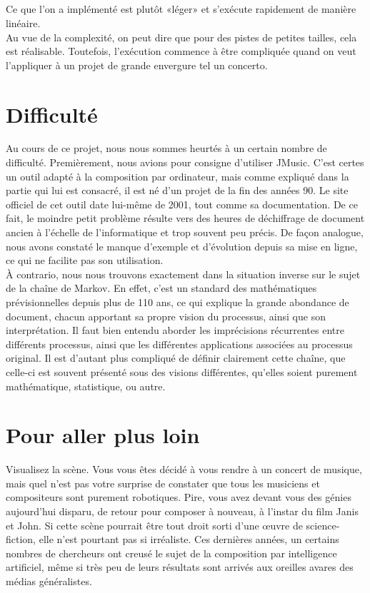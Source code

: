 \documentclass[12pt, a4paper]{article}
\begin{document}
        \subsection*{}
            Ce que l'on a implémenté est plutôt «léger» et s’exécute rapidement de manière linéaire.\\
Au vue de la complexité, on peut dire que pour des pistes de petites tailles, cela est réalisable. Toutefois, l’exécution commence à être compliquée quand on veut l'appliquer à un projet de grande envergure tel un concerto.
                
            
    
    
    \section{Difficulté}
        Au cours de ce projet, nous nous sommes heurtés à un certain nombre de difficulté. Premièrement, nous avions pour consigne d’utiliser JMusic. C’est certes un outil adapté à la composition par ordinateur, mais comme expliqué dans la partie qui lui est consacré, il est né d’un projet de la fin des années 90. Le site officiel de cet outil date lui-même de 2001, tout comme sa documentation. De ce fait, le moindre petit problème résulte vers des heures de déchiffrage de document ancien à l’échelle de l’informatique et trop souvent peu précis. De façon analogue, nous avons constaté le manque d’exemple et d’évolution depuis sa mise en ligne, ce qui ne facilite pas son utilisation.\\
À contrario, nous nous trouvons exactement dans la situation inverse sur le sujet de la chaîne de Markov. En effet, c’est un standard des mathématiques prévisionnelles depuis plus de 110 ans, ce qui explique la grande abondance de document, chacun apportant sa propre vision du processus, ainsi que son interprétation. Il faut bien entendu aborder les imprécisions récurrentes entre différents processus, ainsi que les différentes applications associées au processus original. Il est d’autant plus compliqué de définir clairement cette chaîne, que celle-ci est souvent présenté sous des visions différentes, qu’elles soient purement mathématique, statistique, ou autre.
    
    
    \section{Pour aller plus loin}
        Visualisez la scène. Vous vous êtes décidé à vous rendre à un concert de musique, mais quel n’est pas votre surprise de constater que tous les musiciens et compositeurs sont purement robotiques. Pire, vous avez devant vous des génies aujourd’hui disparu, de retour pour composer à nouveau, à l’instar du film Janis et John. Si cette scène pourrait être tout droit sorti d’une œuvre de science-fiction, elle n’est pourtant pas si irréaliste. Ces dernières années, un certains nombres de chercheurs ont creusé le sujet de la composition par intelligence artificiel, même si très peu de leurs résultats sont arrivés aux oreilles avares des médias généralistes.\\
        
\end{document}
